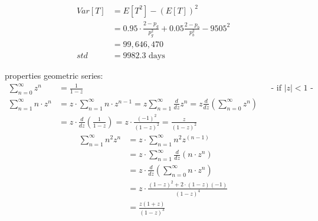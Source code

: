 \begin{align*}
Var\left[T\right] &= E\left[T^{2}\right]-\left(E\left[T\right]\right)^{2}\\
&= 0.95\cdot \frac{2-p_{g}}{p_{g}^{2}}+0.05\frac{2-p_{b}}{p_{b}^{2}} - 9505^2\\
&= 99,646,470 \\
std &= 9982.3 \text{ days}
\end{align*}

properties geometric series:
\begin{align*}
\sum _{{n=0}}^{\infty}z^{n}&=\frac{1}{1-z}&& \text{-  if $|z|< 1$ -}\\
\sum _{{n=1}}^{\infty}n\cdot z^{n}&=z\cdot \sum _{{n=1}}^{\infty}n\cdot z^{{n-1}}=z\sum _{{n=1}}^{\infty}\frac{d}{dz}z^{n}=z\frac{d}{dz}\left(\sum _{{n=0}}^{\infty}z^{n}\right)\\
&=z\cdot \frac{d}{dz}\left(\frac{1}{1-z}\right)=z\cdot \frac{\left(-1\right)^{2}}{\left(1-z\right)^{2}}=\frac{z}{\left(1-z\right)^{2}}
\end{align*}
\begin{align*}
\sum _{{n=1}}^{\infty}n^{2}z^{n}&=z\cdot \sum _{{n=1}}^{\infty}n^{2}z^{\left(n-1\right)}\\
&=z\cdot \sum _{{n=1}}^{\infty}\frac{d}{dz}\left(n\cdot z^{n}\right)\\
&=z\cdot \frac{d}{dz}\left(\sum _{{n=0}}^{\infty}n\cdot z^{n}\right)\\
&=z\cdot \frac{\left(1-z\right)^{2}+2\cdot \left(1-z\right)\left(-1\right)}{\left(1-z\right)^{4}}\\
&=\frac{z\left(1+z\right)}{\left(1-z\right)^{3}}
\end{align*}

\clearpage